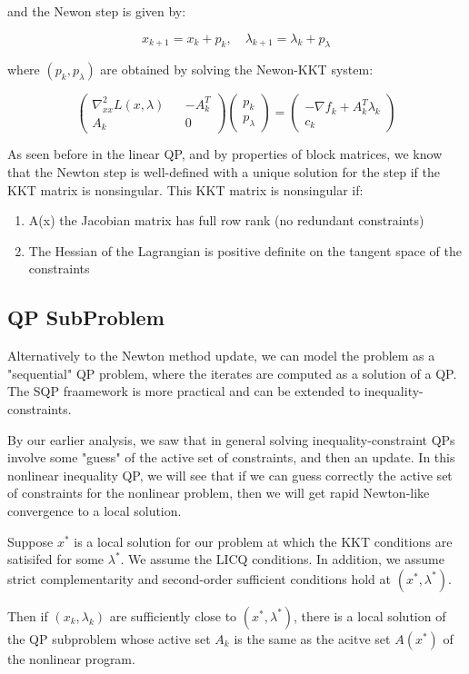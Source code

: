 \documentclass[class=article, crop=false]{standalone}
\begin{document}
		and the Newon step is given by:

			$$x_{k+1} = x_k + p_k,\quad \lambda_{k+1} = \lambda_k + p_\lambda$$

		where $(p_k, p_\lambda)$ are obtained by solving the Newon-KKT system:

			$$\begin{pmatrix} \nabla_{xx}^2 L(x, \lambda) && -A_k^T \\ A_k && 0 \end{pmatrix} \begin{pmatrix} p_k \\ p_\lambda \end{pmatrix} = \begin{pmatrix} -\nabla f_k + A_k^T \lambda_k \\ c_k \end{pmatrix}$$

		As seen before in the linear QP, and by properties of block matrices, we know that the Newton step is well-defined with a unique solution for the step if the KKT matrix is nonsingular. This KKT matrix is nonsingular if:

		\begin{enumerate}
			\item A(x) the Jacobian matrix has full row rank (no redundant constraints)
			\item The Hessian of the Lagrangian is positive definite on the tangent space of the constraints
		\end{enumerate}

	\subsection{QP SubProblem}
		Alternatively to the Newton method update, we can model the problem as a "sequential" QP problem, where the iterates are computed as a solution of a QP. The SQP fraamework is more practical and can be extended to inequality-constraints.

		By our earlier analysis, we saw that in general solving inequality-constraint QPs involve some "guess" of the active set of constraints, and then an update. In this nonlinear inequality QP, we will see that if we can guess correctly the active set of constraints for the nonlinear problem, then we will get rapid Newton-like convergence to a local solution.

		\begin{theorem} 
			Suppose $x^*$ is a local solution for our problem at which the KKT conditions are satisifed for some $\lambda^*$. We assume the LICQ conditions. In addition, we assume strict complementarity and second-order sufficient conditions hold at $(x^*, \lambda^*)$. 

			Then if $(x_k, \lambda_k)$ are sufficiently close to $(x^*, \lambda^*)$, there is a local solution of the QP subproblem whose active set $A_k$ is the same as the acitve set $A(x^*)$ of the nonlinear program.
		\end{theorem}
\end{document}
